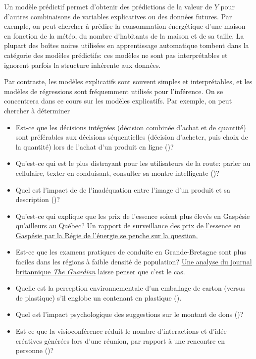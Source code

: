 \documentclass[
  11pt,
  letterpaper,
]{scrbook}
\providecommand{\tightlist}{%
  \setlength{\itemsep}{0pt}\setlength{\parskip}{0pt}}\usepackage{longtable,booktabs,array}
\theoremstyle{plain}
\theoremstyle{plain}
\theoremstyle{definition}
\theoremstyle{definition}
\theoremstyle{remark}
\begin{document}
Un modèle prédictif permet d'obtenir des prédictions de la valeur de
\(Y\) pour d'autres combinaisons de variables explicatives ou des
données futures. Par exemple, on peut chercher à prédire la consommation
énergétique d'une maison en fonction de la météo, du nombre d'habitants
de la maison et de sa taille. La plupart des boîtes noires utilisées en
apprentissage automatique tombent dans la catégorie des modèles
prédictifs: ces modèles ne sont pas interprétables et ignorent parfois
la structure inhérente aux données.

Par contraste, les modèles explicatifs sont souvent simples et
interprétables, et les modèles de régressions sont fréquemment utilisés
pour l'inférence. On se concentrera dans ce cours sur les modèles
explicatifs. Par exemple, on peut chercher à déterminer

\begin{itemize}
\tightlist
\item
  Est-ce que les décisions intégrées (décision combinée d'achat et de
  quantité) sont préférables aux décisions séquentielles (décision
  d'acheter, puis choix de la quantité) lors de l'achat d'un produit en
  ligne ()?
\item
  Qu'est-ce qui est le plus distrayant pour les utilisateurs de la
  route: parler au cellulaire, texter en conduisant, consulter sa montre
  intelligente ()?
\item
  Quel est l'impact de de l'inadéquation entre l'image d'un produit et
  sa description ()?
\item
  Qu'est-ce qui explique que les prix de l'essence soient plus élevés en
  Gaspésie qu'ailleurs au Québec?
  \href{https://ici.radio-canada.ca/nouvelle/1463520/prix-essence-gaspesie-rapport-regie-energie}{Un
  rapport de surveillance des prix de l'essence en Gaspésie par la Régie
  de l'énergie se penche sur la question.}
\item
  Est-ce que les examens pratiques de conduite en Grande-Bretagne sont
  plus faciles dans les régions à faible densité de population?
  \href{https://www.theguardian.com/world/2019/aug/23/an-easy-ride-scottish-village-fuels-debate-driving-test-pass-rates}{Une
  analyse du journal britannique \emph{The Guardian}} laisse penser que
  c'est le cas.
\item
  Quelle est la perception environnementale d'un emballage de carton
  (versus de plastique) s'il englobe un contenant en plastique
  ().
\item
  Quel est l'impact psychologique des suggestions sur le montant de dons
  ()?
\item
  Est-ce que la visioconférence réduit le nombre d'interactions et
  d'idée créatives générées lors d'une réunion, par rapport à une
  rencontre en personne ()?
\end{itemize}
\end{document}
